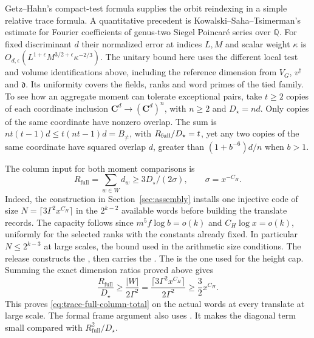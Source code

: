 Getz--Hahn's compact-test formula supplies the orbit reindexing in a
simple relative trace formula. A quantitative precedent is
Kowalski--Saha--Tsimerman's estimate for Fourier coefficients of
genus-two Siegel Poincar\'e series over \(\mathbb Q\). For fixed
discriminant \(d\) their normalized error at indices \(L,M\) and
scalar weight \(\kappa\) is
\(O_{d,\epsilon}(L^{1+\epsilon}M^{3/2+\epsilon}\kappa^{-2/3})\).
\cite[Proposition~3.3, arXiv v4]{tr3kowalski-saha-tsimerman}
The unitary bound here uses the different local test and volume
identifications above, including the reference dimension from
\(V_G\), \(v^\dagger\) and \(\mathfrak d\). Its uniformity covers the
fields, ranks and word primes of the tied family. To see how an
aggregate moment can tolerate exceptional pairs, take \(t\ge2\)
copies of each coordinate inclusion \(\mathbf C^d\to(\mathbf C^d)^n\),
with \(n\ge2\) and \(D_\star=nd\). Only copies of the same coordinate
have nonzero overlap. The sum is \(nt(t-1)d\le t(nt-1)d=B_{\ne}\),
with \(R_{\rm full}/D_\star=t\), yet any two copies of the same
coordinate have squared overlap \(d\), greater than
\((1+b^{-6})d/n\) when \(b>1\).

\leavevmode{}%
The column input for both moment comparisons is
\begin{equation}
 \label{eq:trace-full-column-total}
 R_{\mathrm{full}}=\sum_{w\in W}d_w\ge 3D_\star/(2\sigma),
 \qquad \sigma=x^{-C_H}.
\end{equation}
Indeed, the construction in Section~\ref{sec:assembly} installs one
injective code of size \(N=\lceil3\Gamma^2x^{C_H}\rceil\) in the
\(2^{k-2}\) available words before building the translate records.
The capacity follows since \(m^5 f\log b=o(k)\) and
\(C_H\log x=o(k)\), uniformly for the selected ranks with the
constants already fixed. In particular \(N\le 2^{k-3}\) at large
scales, the bound used in the arithmetic size conditions.
The release constructs the
,
then carries the
.
The
is the one used for the height cap.
Summing the exact dimension ratios proved above gives
\[
 \frac{R_{\mathrm{full}}}{D_\star}
 \ge \frac{|W|}{2\Gamma^2}
 =\frac{\lceil3\Gamma^2x^{C_H}\rceil}{2\Gamma^2}
 \ge \frac{3}{2}x^{C_H}.
\]
This proves \eqref{eq:trace-full-column-total} on the actual words at
every translate at large scale. The formal frame argument also uses
.
It makes the diagonal term small compared with
\(R_{\mathrm{full}}^2/D_\star\).

